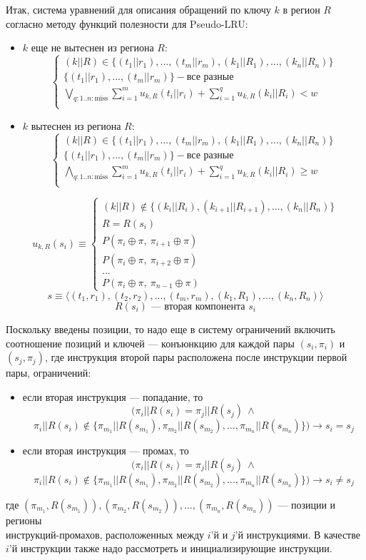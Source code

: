 \documentclass[14pt]{extreport}
\newcommand{\PseudoLRU}{\textsf{Pseudo-LRU}\xspace}
\begin{document}
Итак, система уравнений для описания обращений по ключу $k$ в регион $R$
согласно методу функций полезности для \PseudoLRU:
\begin{itemize}
\item $k$ еще не вытеснен из региона $R$:
$$
\left\{\begin{array}{l}
(k||R) \in \{(t_1||r_1), ..., (t_m||r_m), (k_1||R_1), ..., (k_n||R_n)\}\\
\{(t_1||r_1), ..., (t_m||r_m)\} - \mbox{все разные}\\
\bigvee_{q:1..n:\mbox{miss}} \sum\limits_{i=1}^m u_{k,R}(t_i||r_i) +
\sum\limits_{i=1}^q u_{k,R}(k_i||R_i) < w\\
\end{array} \right.
$$
\item $k$ вытеснен из региона $R$:
$$
\left\{\begin{array}{l} (k||R) \in \{(t_1||r_1), ..., (t_m||r_m), (k_1||R_1),
..., (k_n||R_n)\}\\
\{(t_1||r_1), ..., (t_m||r_m)\} - \mbox{все разные}\\
\bigwedge_{q:1..n:\mbox{miss}} \sum\limits_{i=1}^m u_{k,R}(t_i||r_i) +
\sum\limits_{i=1}^q u_{k,R}(k_i||R_i) \geqslant w\\
\end{array} \right.
$$
\end{itemize}

$$u_{k,R} (s_i) \equiv \left\{\begin{array}{l}
(k||R) \notin \{(k_i||R_i), (k_{i+1}||R_{i+1}), ..., (k_n||R_n)\}\\
R = R(s_i)\\
P(\pi_i \oplus \pi,~\pi_{i+1} \oplus \pi)\\
P(\pi_i \oplus \pi,~\pi_{i+2} \oplus \pi)\\
... \\
P(\pi_i \oplus \pi,~\pi_{n-1} \oplus \pi)
\end{array}\right.
$$
$$s \equiv \langle (t_1,r_1), (t_2,r_2), ..., (t_m,r_m), (k_1, R_1), ...,
(k_n,R_n) \rangle$$
$$R(s_i) \mbox{~--- вторая компонента~} s_i$$

Поскольку введены позиции, то надо еще в систему ограничений включить
соотношение позиций и ключей --- конъюнкцию для каждой пары $(s_i,\pi_i)$ и
$(s_j, \pi_j)$, где инструкция второй пары расположена после инструкции первой
пары, ограничений:
\begin{itemize}
    \item если вторая инструкция --- попадание, то $$(\pi_i||R(s_i) =
\pi_j||R(s_j)~\wedge$$ $$\pi_i||R(s_i) \notin \{\pi_{m_1}||R(s_{m_1}),
\pi_{m_2}||R(s_{m_2}), \dots, \pi_{m_n}||R(s_{m_n})\}) \rightarrow s_i = s_j$$
    \item если вторая инструкция --- промах, то $$(\pi_i||R(s_i) =
\pi_j||R(s_j)~\wedge$$ $$\pi_i||R(s_i) \notin \{\pi_{m_1}||R(s_{m_1}),
\pi_{m_2}||R(s_{m_2}), \dots, \pi_{m_n}||R(s_{m_n})\}) \rightarrow s_i \neq
s_j$$
\end{itemize}
где $(\pi_{m_1},R(s_{m_1})), (\pi_{m_2},R(s_{m_2})), \dots,
(\pi_{m_n},R(s_{m_n}))$ --- позиции и регионы\\инструкций-промахов,
расположенных между $i$'й и $j$'й инструкциями. В качестве $i$'й инструкции
также надо рассмотреть и инициализирующие инструкции.
\end{document}
